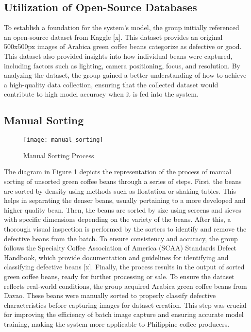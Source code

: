 \subsection{Utilization of Open-Source Databases}
To establish a foundation for the system's model, the group initially referenced an open-source dataset from Kaggle [x]. This dataset provides an original 500x500px images of Arabica green coffee beans categorize as defective or good. This dataset also provided insights into how individual beans were captured, including factors such as lighting, camera positioning, focus, and resolution. By analyzing the dataset, the group gained a better understanding of how to achieve a high-quality data collection, ensuring that the collected dataset would contribute to high model accuracy when it is fed into the system.

\subsection{Manual Sorting}

\begin{figure}[h]
    \centering
    \texttt{[image: manual\_sorting]}
    \caption{Manual Sorting Process}
    \label{fig:manual_sorting}
\end{figure}

The diagram in Figure \ref{fig:manual_sorting} depicts the representation of the process of manual sorting of unsorted green coffee beans through a series of steps. First, the beans are sorted by density using methods such as floatation or shaking tables. This helps in separating the denser beans, usually pertaining to a more developed and higher quality bean. Then, the beans are sorted by size using screens and sieves with specific dimensions depending on the variety of the beans. After this, a thorough visual inspection is performed by the sorters to identify and remove the defective beans from the batch. To ensure consistency and accuracy, the group follows the Specialty Coffee Association of America (SCAA) Standards Defect Handbook, which provide documentation and guidelines for identifying and classifying defective beans [x]. Finally, the process results in the output of sorted green coffee beans, ready for further processing or sale. 
To ensure the dataset reflects real-world conditions, the group acquired Arabica green coffee beans from Davao. These beans were manually sorted to properly classify defective characteristics before capturing images for dataset creation. This step was crucial for improving the efficiency of batch image capture and ensuring accurate model training, making the system more applicable to Philippine coffee producers.

